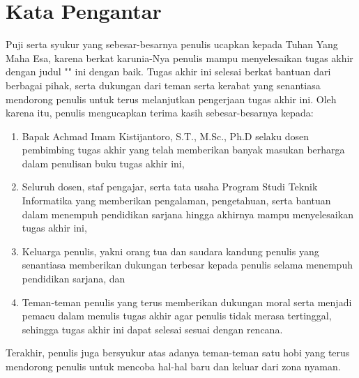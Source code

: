 \chapter*{Kata Pengantar}

Puji serta syukur yang sebesar-besarnya penulis ucapkan kepada Tuhan Yang Maha Esa, karena berkat karunia-Nya penulis mampu menyelesaikan tugas akhir dengan judul "\thetitle" ini dengan baik. Tugas akhir ini selesai berkat bantuan dari berbagai pihak, serta dukungan dari teman serta kerabat yang senantiasa mendorong penulis untuk terus melanjutkan pengerjaan tugas akhir ini. Oleh karena itu, penulis mengucapkan terima kasih sebesar-besarnya kepada:

\begin{enumerate}
  \item Bapak Achmad Imam Kistijantoro, S.T., M.Sc., Ph.D selaku dosen pembimbing tugas akhir yang telah memberikan banyak masukan berharga dalam penulisan buku tugas akhir ini,
  \item Seluruh dosen, staf pengajar, serta tata usaha Program Studi Teknik Informatika yang memberikan pengalaman, pengetahuan, serta bantuan dalam menempuh pendidikan sarjana hingga akhirnya mampu menyelesaikan tugas akhir ini,
  \item Keluarga penulis, yakni orang tua dan saudara kandung penulis yang senantiasa memberikan dukungan terbesar kepada penulis selama menempuh pendidikan sarjana, dan
  \item Teman-teman penulis yang terus memberikan dukungan moral serta menjadi pemacu dalam menulis tugas akhir agar penulis tidak merasa tertinggal, sehingga tugas akhir ini dapat selesai sesuai dengan rencana.
\end{enumerate}

Terakhir, penulis juga bersyukur atas adanya teman-teman satu hobi yang terus mendorong penulis untuk mencoba hal-hal baru dan keluar dari zona nyaman.
